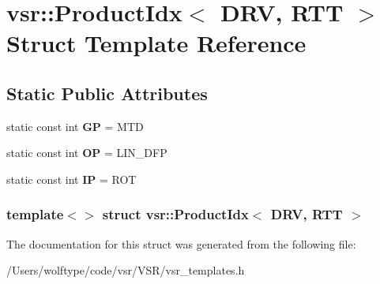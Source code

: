 \hypertarget{structvsr_1_1_product_idx_3_01_d_r_v_00_01_r_t_t_01_4}{\section{vsr\-:\-:Product\-Idx$<$ D\-R\-V, R\-T\-T $>$ Struct Template Reference}
\label{structvsr_1_1_product_idx_3_01_d_r_v_00_01_r_t_t_01_4}
}
\subsection*{Static Public Attributes}
\begin{DoxyCompactItemize}
\item 
\hypertarget{structvsr_1_1_product_idx_3_01_d_r_v_00_01_r_t_t_01_4_a7ed8c227a86da9fc897f0458d5dd9e30}{static const int {\bfseries G\-P} = M\-T\-D}\label{structvsr_1_1_product_idx_3_01_d_r_v_00_01_r_t_t_01_4_a7ed8c227a86da9fc897f0458d5dd9e30}

\item 
\hypertarget{structvsr_1_1_product_idx_3_01_d_r_v_00_01_r_t_t_01_4_a68f91b10b76d51edd1cc316cbfbae304}{static const int {\bfseries O\-P} = L\-I\-N\-\_\-\-D\-F\-P}\label{structvsr_1_1_product_idx_3_01_d_r_v_00_01_r_t_t_01_4_a68f91b10b76d51edd1cc316cbfbae304}

\item 
\hypertarget{structvsr_1_1_product_idx_3_01_d_r_v_00_01_r_t_t_01_4_a0c9f4c0024f16ce4077360a482409b87}{static const int {\bfseries I\-P} = R\-O\-T}\label{structvsr_1_1_product_idx_3_01_d_r_v_00_01_r_t_t_01_4_a0c9f4c0024f16ce4077360a482409b87}

\end{DoxyCompactItemize}
\subsubsection*{template$<$$>$ struct vsr\-::\-Product\-Idx$<$ D\-R\-V, R\-T\-T $>$}



The documentation for this struct was generated from the following file\-:\begin{DoxyCompactItemize}
\item 
/\-Users/wolftype/code/vsr/\-V\-S\-R/vsr\-\_\-templates.\-h\end{DoxyCompactItemize}
